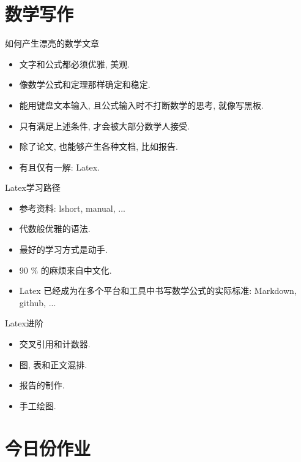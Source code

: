 \documentclass{beamer}
\begin{document}
\section{数学写作}
\begin{frame}{如何产生漂亮的数学文章}
  \begin{itemize}
  \item<1-> 文字和公式都必须优雅, 美观.
  \item<2-> 像数学公式和定理那样确定和稳定.
  \item<3-> 能用键盘文本输入, 且公式输入时不打断数学的思考, 就像写黑板.
  \item<4-> 只有满足上述条件, 才会被大部分数学人接受.
  \item<5-> 除了论文, 也能够产生各种文档, 比如报告.
  \item<6-> 有且仅有一解: Latex.
  \end{itemize}
\end{frame}

\begin{frame}{Latex学习路径}
  \begin{itemize}
  \item<1-> 参考资料: lshort, manual, ...
  \item<2-> 代数般优雅的语法.
  \item<3-> 最好的学习方式是动手. 
  \item<4-> 90 \% 的麻烦来自中文化.
  \item<5-> Latex 已经成为在多个平台和工具中书写数学公式的实际标准: Markdown, github, ...
  \end{itemize}
\end{frame}

\begin{frame}{Latex进阶}
  \begin{itemize}
  \item<1-> 交叉引用和计数器.
  \item<2-> 图, 表和正文混排.
  \item<3-> 报告的制作.
  \item<4-> 手工绘图.
  \end{itemize}
\end{frame}

\section{今日份作业}
\end{document}
